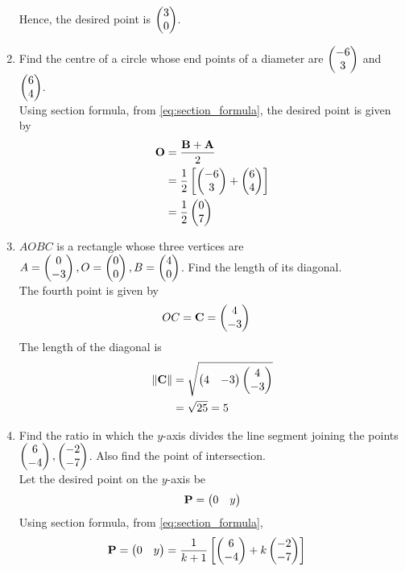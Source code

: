 \documentclass[journal,12pt,twocolumn]{IEEEtran}
\renewcommand\thesection{\arabic{section}}
\begin{document}
\begin{enumerate}[label=\thesection.\arabic*.,ref=\thesection.\theenumi]
\begin{align}
  \end{align}
  Hence, the desired point is $\begin{pmatrix} 3 \\ 0\end{pmatrix}$.
  \item Find the centre of a circle whose end points of a diameter are $\begin{pmatrix} -6 \\ 3\end{pmatrix}$ and $\begin{pmatrix}6 \\ 4\end{pmatrix}$.
	  \\
		\solution 
Using section formula, 
	  from \eqref{eq:section_formula},
		the desired point is given by 
  \begin{align}
	  \mathbf{O}&= \frac{\mathbf{B}+ \mathbf{A}}{2}
	  \\
	  &= \frac{1}{2}{}\left[\begin{pmatrix} -6 \\ 3\end{pmatrix}+\begin{pmatrix}6 \\ 4\end{pmatrix}\right]
	  \\
	  &=\frac{1}{2}\begin{pmatrix}0 \\ 7\end{pmatrix}
  \end{align}
  \item $AOBC$  is a rectangle whose three vertices are $A = \begin{pmatrix}0\\-3\end{pmatrix}, O = \begin{pmatrix}0\\0\end{pmatrix}, B = \begin{pmatrix}4\\0\end{pmatrix}$.  Find the length of its diagonal. 
	  \\
		\solution The fourth point is given by 
  \begin{align}
	 OC =  \mathbf{C}&=\begin{pmatrix}4 \\ -3\end{pmatrix}
  \end{align}
  The length of the diagonal is 
		\begin{align}
			\left\lVert\mathbf{C}\right\rVert &= 
			 \sqrt{\begin{pmatrix}4 & -3\end{pmatrix}\begin{pmatrix}4 \\ -3\end{pmatrix}} 
\\
			&			=  \sqrt{25} = 5
		\end{align}
	\item  Find the ratio in which the $y$-axis divides the line segment joining the points $\begin{pmatrix}6 \\ -4\end{pmatrix}, \begin{pmatrix}-2 \\ -7\end{pmatrix} $.  Also find the point of intersection.
		\\
		\solution  Let the desired point on the $y$-axis be  
		\begin{align}
\mathbf{P} = \begin{pmatrix}0 & y\end{pmatrix}
		\end{align}
Using section formula, 
	  from \eqref{eq:section_formula},
		\begin{align}
			\vec{P} &= \myvec{0 & y}= \frac{1}{k+1}\sbrak{\myvec{6 \\ -4}+ k\myvec{-2 \\ -7} }

\end{align}
\end{enumerate}
\end{document}
